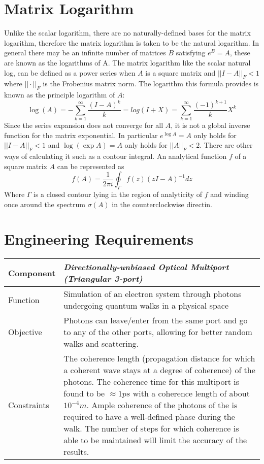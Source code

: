 \section{Matrix Logarithm}
Unlike the scalar logarithm, there are no naturally-defined bases for the matrix logarithm, therefore the matrix logarithm is taken to be the natural logarithm. In general there may be an infinite number of matrices $B$ satisfying $e^{B} = A$, these are known as the logarithms of A. \newline
The matrix logarithm like the scalar natural log, can be defined as a power series when $A$ is a square matrix and $||I-A||_{F} < 1$ where $|| \cdot ||_{F}$ is the Frobenius matrix norm. The logarithm this formula provides is known as the principle logarithm of $A$:
\begin{equation}
    \log(A) = -\sum_{k=1}^{\infty} \frac{(I-A)^{k}}{k} = log(I+X) = \sum_{k=1}^{\infty} \frac{(-1)^{k+1}}{k}X^{k}
\end{equation}
Since the series expansion does not converge for all $A$, it is not a global inverse function for the matrix exponential. In particular $e^{\log A} =A$ only holds for  $||I-A||_{F} < 1$ and $\log(\exp A) = A$ only holds for $||A||_{F} < 2$. \newline
There are other ways of calculating it such as a contour integral. An analytical function $f$ of a square matrix $A$ can be represented as
\begin{equation}
    f(A) = \frac{1}{2\pi i} \oint_{\Gamma} f(z) (zI - A)^{-1} dz
\end{equation} 
Where $\Gamma$ is a closed contour lying in the region of analyticity of $f$ and winding once around the spectrum $\sigma(A)$ in the counterclockwise directin. 

\newpage
\section{Engineering Requirements}

\begin{center}
\begin{tabular}{ | m{6em} | m{12cm} |}
 \hline
 \textbf{Component} & \textit{Directionally-unbiased Optical Multiport (Triangular 3-port)} \\
 \hline
 Function  & Simulation of an electron system through photons undergoing quantum walks in a physical space  \\
\hline
Objective & Photons can leave/enter from the same port and go to any of the other ports, allowing for better random walks and scattering. \\
\hline
Constraints & The coherence length (propagation distance for which a coherent wave stays at a degree of coherence) of the photons. The coherence time for this multiport is found to be  $\approx 1 \si{ps}$ with a coherence length of about $10^{-4} \si{m}$. Ample coherence of the photons of the is required to have a well-defined phase during the walk. The number of steps for which coherence is able to be maintained will limit the accuracy of the results. \\
\hline
\end{tabular}
\end{center}
\newpage


